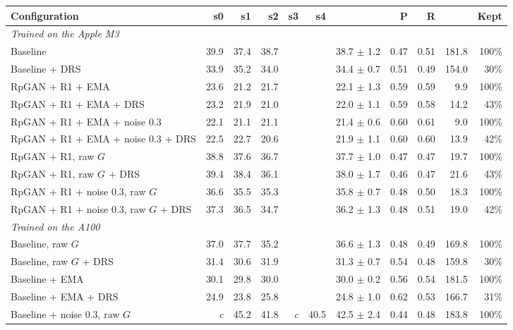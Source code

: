 \begin{table}[H]
\centering
\footnotesize
\setlength{\tabcolsep}{4pt}
\begin{tabular}{lrrrrrrrrrr}
\toprule
Configuration & s0 & s1 & s2 & s3 & s4 & \finc{} & P & R & \fcnn{} & Kept \\
\midrule
\multicolumn{11}{l}{\textit{Trained on the Apple M3}} \\
Baseline & 39.9 & 37.4 & 38.7 &  &  & 38.7 $\pm$ 1.2 & 0.47 & 0.51 & 181.8 & 100\% \\
Baseline + DRS & 33.9 & 35.2 & 34.0 &  &  & 34.4 $\pm$ 0.7 & 0.51 & 0.49 & 154.0 & 30\% \\
RpGAN + R1 + EMA & 23.6 & 21.2 & 21.7 &  &  & 22.1 $\pm$ 1.3 & 0.59 & 0.59 & 9.9 & 100\% \\
RpGAN + R1 + EMA + DRS & 23.2 & 21.9 & 21.0 &  &  & 22.0 $\pm$ 1.1 & 0.59 & 0.58 & 14.2 & 43\% \\
RpGAN + R1 + EMA + noise 0.3 & 22.1 & 21.1 & 21.1 &  &  & 21.4 $\pm$ 0.6 & 0.60 & 0.61 & 9.0 & 100\% \\
RpGAN + R1 + EMA + noise 0.3 + DRS & 22.5 & 22.7 & 20.6 &  &  & 21.9 $\pm$ 1.1 & 0.60 & 0.60 & 13.9 & 42\% \\
RpGAN + R1, raw $G$ & 38.8 & 37.6 & 36.7 &  &  & 37.7 $\pm$ 1.0 & 0.47 & 0.47 & 19.7 & 100\% \\
RpGAN + R1, raw $G$ + DRS & 39.4 & 38.4 & 36.1 &  &  & 38.0 $\pm$ 1.7 & 0.46 & 0.47 & 21.6 & 43\% \\
RpGAN + R1 + noise 0.3, raw $G$ & 36.6 & 35.5 & 35.3 &  &  & 35.8 $\pm$ 0.7 & 0.48 & 0.50 & 18.3 & 100\% \\
RpGAN + R1 + noise 0.3, raw $G$ + DRS & 37.3 & 36.5 & 34.7 &  &  & 36.2 $\pm$ 1.3 & 0.48 & 0.51 & 19.0 & 42\% \\
\midrule
\multicolumn{11}{l}{\textit{Trained on the A100}} \\
Baseline, raw $G$ & 37.0 & 37.7 & 35.2 &  &  & 36.6 $\pm$ 1.3 & 0.48 & 0.49 & 169.8 & 100\% \\
Baseline, raw $G$ + DRS & 31.4 & 30.6 & 31.9 &  &  & 31.3 $\pm$ 0.7 & 0.54 & 0.48 & 159.8 & 30\% \\
Baseline + EMA & 30.1 & 29.8 & 30.0 &  &  & 30.0 $\pm$ 0.2 & 0.56 & 0.54 & 181.5 & 100\% \\
Baseline + EMA + DRS & 24.9 & 23.8 & 25.8 &  &  & 24.8 $\pm$ 1.0 & 0.62 & 0.53 & 166.7 & 31\% \\
Baseline + noise 0.3, raw $G$ & \textit{c} & 45.2 & 41.8 & \textit{c} & 40.5 & 42.5 $\pm$ 2.4 & 0.44 & 0.48 & 183.8 & 100\% \\

\end{tabular}
\end{table}
